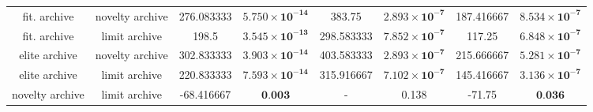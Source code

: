 \begin{tabular}{cccccccc}
   fit. archive & novelty archive &     276.083333 & $\mathbf{5.750 \times 10^{-14}}$ &      383.75 & $\mathbf{2.893 \times 10^{-7}}$ &  187.416667 & $\mathbf{8.534 \times 10^{-7}}$ \\
   fit. archive &   limit archive &          198.5 & $\mathbf{3.545 \times 10^{-13}}$ &  298.583333 & $\mathbf{7.852 \times 10^{-7}}$ &      117.25 & $\mathbf{6.848 \times 10^{-7}}$ \\
  elite archive & novelty archive &     302.833333 & $\mathbf{3.903 \times 10^{-14}}$ &  403.583333 & $\mathbf{2.893 \times 10^{-7}}$ &  215.666667 & $\mathbf{5.281 \times 10^{-7}}$ \\
  elite archive &   limit archive &     220.833333 & $\mathbf{7.593 \times 10^{-14}}$ &  315.916667 & $\mathbf{7.102 \times 10^{-7}}$ &  145.416667 & $\mathbf{3.136 \times 10^{-7}}$ \\
novelty archive &   limit archive &     -68.416667 &                 $\textbf{0.003}$ &           - &                           0.138 &      -71.75 &                $\textbf{0.036}$ \\
\bottomrule
\end{tabular}
